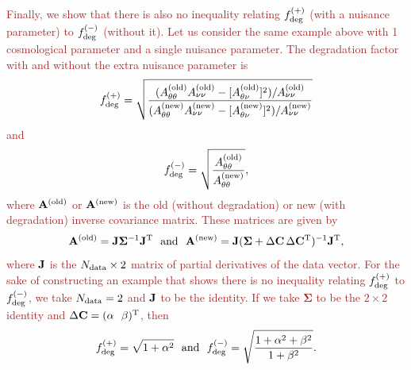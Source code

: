 \documentclass[usenatbib]{mnras}
\newcommand{\changetext}[1]{\textcolor{brown}{#1}}
\begin{document}
\changetext{Finally, we show that there is also no inequality relating $f_{\rm deg}^{(+)}$ (with a nuisance parameter) to $f_{\rm deg}^{(-)}$ (without it). Let us consider the same example above with 1 cosmological parameter and a single nuisance parameter. The degradation factor with and without the extra nuisance parameter is
\begin{equation}
f_{\rm deg}^{(+)} = \sqrt{ \frac{
(A_{\theta\theta}^{\rm(old)} A_{\nu\nu}^{\rm(old)} - [A_{\theta\nu}^{\rm(old)}]^2)/A_{\nu\nu}^{\rm(old)}
}{
(A_{\theta\theta}^{\rm(new)} A_{\nu\nu}^{\rm(new)} - [A_{\theta\nu}^{\rm(new)}]^2)/A_{\nu\nu}^{\rm(new)}
}}
\end{equation}
and
\begin{equation}
f_{\rm deg}^{(-)} = \sqrt{ \frac{A_{\theta\theta}^{\rm(old)}}{A_{\theta\theta}^{\rm(new)}} },
\end{equation}
where ${\bf A}^{\rm(old)}$ or ${\bf A}^{\rm(new)}$ is the old (without degradation) or new (with degradation) inverse covariance matrix. These matrices are given by
\begin{equation}
{\bf A}^{\rm(old)} = {\bf J}{\boldsymbol\Sigma}^{-1}{\bf J}^{\rm T}
~~{\rm and}~~
{\bf A}^{\rm(new)} = {\bf J}({\boldsymbol\Sigma} + \Delta{\bf C}\,\Delta{\bf C}^{\rm T})^{-1}{\bf J}^{\rm T},
\end{equation}
where ${\bf J}$ is the $N_{\rm data}\times 2$ matrix of partial derivatives of the data vector. For the sake of constructing an example that shows there is no inequality relating $f_{\rm deg}^{(+)}$ to $f_{\rm deg}^{(-)}$, we take $N_{\rm data}=2$ and ${\bf J}$ to be the identity. If we take ${\boldsymbol\Sigma}$ to be the $2\times 2$ identity and $\Delta{\bf C} = (\alpha~~\beta)^{\rm T}$, then
\begin{equation}
f_{\rm deg}^{(+)} = \sqrt{1+\alpha^2} ~~{\rm and}~~ f_{\rm deg}^{(-)} = \sqrt{\frac{1+\alpha^2+\beta^2}{1+\beta^2}}.
\end{equation}
}
\end{document}

